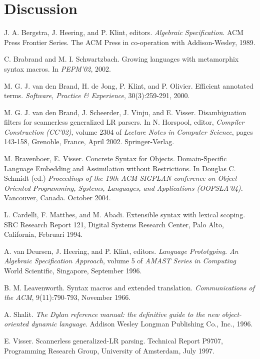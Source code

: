\documentclass[a4paper,11pt]{article}
\begin{document}
\section{Discussion}\label{sec:discussion}


\begin{thebibliography}{99}

J. A. Bergstra, J. Heering, and P. Klint, editors. \emph{Algebraic
Specification}. ACM Press Frontier Series. The ACM Press in co-operation with Addison-Wesley,
1989.

C. Brabrand and M. I. Schwartzbach. Growing languages with metamorphix
syntax macros. In \emph{PEPM'02}, 2002.

M. G. J. van den Brand, H. de Jong, P. Klint, and P. Olivier. Efficient
annotated terms. \emph{Software, Practice \& Experience}, 30(3):259-291, 2000.

M. G. J. van den Brand, J. Scheerder, J. Vinju, and E. Visser.
Disambiguation filters for scannerless generalized LR parsers. In N. Horspool, editor,
\emph{Compiler Construction (CC'02)}, volume 2304 of \emph{Lecture Notes in Computer
Science}, pages 143-158, Grenoble, France, April 2002. Springer-Verlag.

M. Bravenboer, E. Visser. Concrete Syntax for Objects.
Domain-Specific Language Embedding and Assimilation without Restrictions. In Douglas
C. Schmidt (ed.) \emph{Proceedings of the 19th ACM SIGPLAN conference on
Object-Oriented Programming, Systems, Languages, and Applications (OOPSLA'04).}
Vancouver, Canada. October 2004.

L. Cardelli, F. Matthes, and M. Abadi. Extensible syntax with lexical
scoping. SRC Research Report 121, Digital Systems Research Center, Palo Alto,
California, Februari 1994.

A. van Deursen, J. Heering, and P. Klint, editors. \emph{Language Prototyping.
An Algebraic Specification Approach}, volume 5 of \emph{AMAST Series in Computing} World
Scientific, Singapore, September 1996.

B. M. Leavenworth. Syntax macros and extended translation. \emph{Communications
of the ACM}, 9(11):790-793, November 1966.

A. Shalit. \emph{The Dylan reference manual: the definitive guide
to the new object-oriented dynamic language}. Addison Wesley Longman Publishing
Co., Inc., 1996.

E. Visser. Scannerless generalized-LR parsing.
Technical Report P9707, Programming Research Group, University of Amsterdam, July 1997.


\end{thebibliography}
\end{document}
